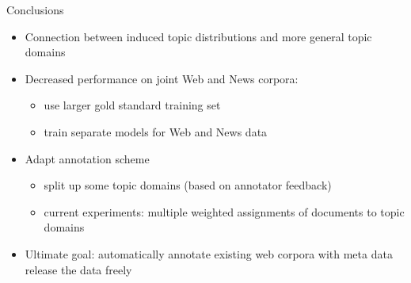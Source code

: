 \documentclass{beamer}
\begin{document}
\begin{frame}
  {Conclusions}
  \begin{itemize}
    \item Connection between induced topic distributions and more general topic domains
\pause
    \vspace{.25cm}
    \item Decreased performance on joint Web and News corpora:
    \begin{itemize}
      \item use larger gold standard training set
      \item train separate models for Web and News data
    \end{itemize}
\pause
    \vspace{.25cm}
    \item Adapt annotation scheme
    \begin{itemize}
      \item split up some topic domains (based on annotator feedback)
      \item current experiments: multiple weighted assignments of documents to topic domains
    \end{itemize}
\pause
    \vspace{.25cm}
    \item Ultimate goal: automatically annotate existing web corpora with meta data release the data freely
  \end{itemize}
\pause
\pause
\pause
\end{frame}
\end{document}
